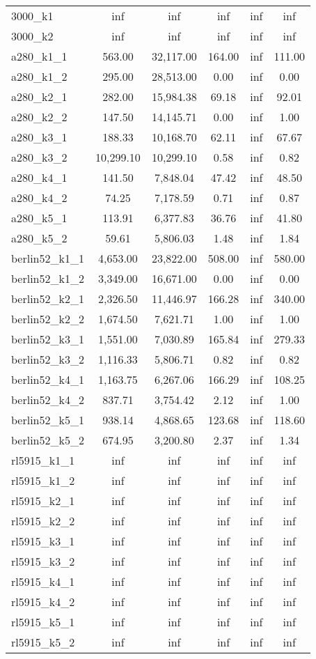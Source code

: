\documentclass{article}
\begin{document}
\begin{center}
\begin{tabular}{|l|c|c|c|c|c|}
3000\_k1 & inf & inf & inf & inf & inf \\
3000\_k2 & inf & inf & inf & inf & inf \\
a280\_k1\_1 & 563.00 & 32,117.00 & 164.00 & inf & 111.00 \\
a280\_k1\_2 & 295.00 & 28,513.00 & 0.00 & inf & 0.00 \\
a280\_k2\_1 & 282.00 & 15,984.38 & 69.18 & inf & 92.01 \\
a280\_k2\_2 & 147.50 & 14,145.71 & 0.00 & inf & 1.00 \\
a280\_k3\_1 & 188.33 & 10,168.70 & 62.11 & inf & 67.67 \\
a280\_k3\_2 & 10,299.10 & 10,299.10 & 0.58 & inf & 0.82 \\
a280\_k4\_1 & 141.50 & 7,848.04 & 47.42 & inf & 48.50 \\
a280\_k4\_2 & 74.25 & 7,178.59 & 0.71 & inf & 0.87 \\
a280\_k5\_1 & 113.91 & 6,377.83 & 36.76 & inf & 41.80 \\
a280\_k5\_2 & 59.61 & 5,806.03 & 1.48 & inf & 1.84 \\
berlin52\_k1\_1 & 4,653.00 & 23,822.00 & 508.00 & inf & 580.00 \\
berlin52\_k1\_2 & 3,349.00 & 16,671.00 & 0.00 & inf & 0.00 \\
berlin52\_k2\_1 & 2,326.50 & 11,446.97 & 166.28 & inf & 340.00 \\
berlin52\_k2\_2 & 1,674.50 & 7,621.71 & 1.00 & inf & 1.00 \\
berlin52\_k3\_1 & 1,551.00 & 7,030.89 & 165.84 & inf & 279.33 \\
berlin52\_k3\_2 & 1,116.33 & 5,806.71 & 0.82 & inf & 0.82 \\
berlin52\_k4\_1 & 1,163.75 & 6,267.06 & 166.29 & inf & 108.25 \\
berlin52\_k4\_2 & 837.71 & 3,754.42 & 2.12 & inf & 1.00 \\
berlin52\_k5\_1 & 938.14 & 4,868.65 & 123.68 & inf & 118.60 \\
berlin52\_k5\_2 & 674.95 & 3,200.80 & 2.37 & inf & 1.34 \\
rl5915\_k1\_1 & inf & inf & inf & inf & inf \\
rl5915\_k1\_2 & inf & inf & inf & inf & inf \\
rl5915\_k2\_1 & inf & inf & inf & inf & inf \\
rl5915\_k2\_2 & inf & inf & inf & inf & inf \\
rl5915\_k3\_1 & inf & inf & inf & inf & inf \\
rl5915\_k3\_2 & inf & inf & inf & inf & inf \\
rl5915\_k4\_1 & inf & inf & inf & inf & inf \\
rl5915\_k4\_2 & inf & inf & inf & inf & inf \\
rl5915\_k5\_1 & inf & inf & inf & inf & inf \\
rl5915\_k5\_2 & inf & inf & inf & inf & inf \\
\hline
\end{tabular}
\end{center}
\end{document}
